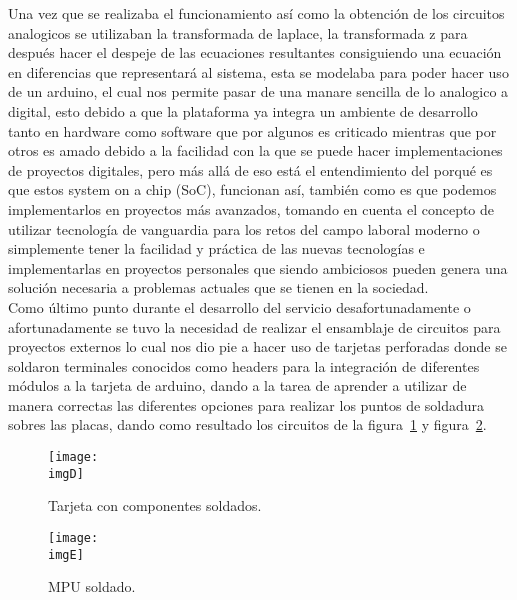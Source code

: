 \documentclass[a4paper,12pt]{article}
\newcommand{\imgD}{img/perforada.png}
\newcommand{\imgE}{img/mpu.png}
\begin{document}
        Una vez que se realizaba el funcionamiento así como la obtención de los circuitos analogicos se utilizaban la transformada de laplace, la transformada z para después hacer el despeje de las ecuaciones resultantes consiguiendo una ecuación en diferencias que representará al sistema, esta se modelaba para poder hacer uso de un arduino, el cual nos permite pasar de una manare sencilla de lo analogico a digital, esto debido a que la plataforma ya integra un ambiente de desarrollo tanto en hardware como software que por algunos es criticado mientras que por otros es amado debido a la facilidad con la que se puede hacer implementaciones de proyectos digitales, pero más allá de eso está el entendimiento del porqué es que estos system on a chip (SoC), funcionan así, también como es que podemos implementarlos en proyectos más avanzados, tomando en cuenta el concepto de utilizar tecnología de vanguardia para los retos del campo laboral moderno o simplemente tener la facilidad y práctica de las nuevas tecnologías e implementarlas en proyectos personales que siendo ambiciosos pueden genera una solución necesaria a problemas actuales que se tienen en la sociedad.\\
        Como último punto durante el desarrollo del servicio desafortunadamente o afortunadamente  se tuvo la necesidad de realizar el ensamblaje de circuitos para proyectos externos lo cual nos dio pie a hacer uso de tarjetas perforadas donde se soldaron terminales conocidos como headers para la integración de diferentes módulos a la tarjeta de arduino, dando a la tarea de aprender a utilizar de manera correctas las diferentes opciones para realizar los puntos de soldadura sobres las placas, dando como resultado los circuitos de la figura~\ref{fig:D} y figura~\ref{fig:E}.

        \begin{figure}[H] 
            \centering 
            \texttt{[image: \\imgD]} 
            \caption{Tarjeta con componentes soldados.} 
            \label{fig:D} 
        \end{figure} 
        \begin{figure}[H] 
            \centering 
            \texttt{[image: \\imgE]} 
            \caption{MPU soldado.} 
            \label{fig:E} 
        \end{figure} 
\end{document}
